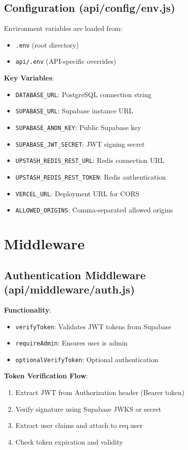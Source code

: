 \documentclass[12pt,a4paper]{report}
\begin{document}
\subsection{Configuration (api/config/env.js)}

Environment variables are loaded from:
\begin{itemize}
    \item \texttt{.env} (root directory)
    \item \texttt{api/.env} (API-specific overrides)
\end{itemize}

\textbf{Key Variables}:
\begin{itemize}
    \item \texttt{DATABASE\_URL}: PostgreSQL connection string
    \item \texttt{SUPABASE\_URL}: Supabase instance URL
    \item \texttt{SUPABASE\_ANON\_KEY}: Public Supabase key
    \item \texttt{SUPABASE\_JWT\_SECRET}: JWT signing secret
    \item \texttt{UPSTASH\_REDIS\_REST\_URL}: Redis connection URL
    \item \texttt{UPSTASH\_REDIS\_REST\_TOKEN}: Redis authentication
    \item \texttt{VERCEL\_URL}: Deployment URL for CORS
    \item \texttt{ALLOWED\_ORIGINS}: Comma-separated allowed origins
\end{itemize}

\section{Middleware}

\subsection{Authentication Middleware (api/middleware/auth.js)}

\textbf{Functionality}:
\begin{itemize}
    \item \texttt{verifyToken}: Validates JWT tokens from Supabase
    \item \texttt{requireAdmin}: Ensures user is admin
    \item \texttt{optionalVerifyToken}: Optional authentication
\end{itemize}

\textbf{Token Verification Flow}:
\begin{enumerate}
    \item Extract JWT from Authorization header (Bearer token)
    \item Verify signature using Supabase JWKS or secret
    \item Extract user claims and attach to req.user
    \item Check token expiration and validity
\end{enumerate}
\end{document}
